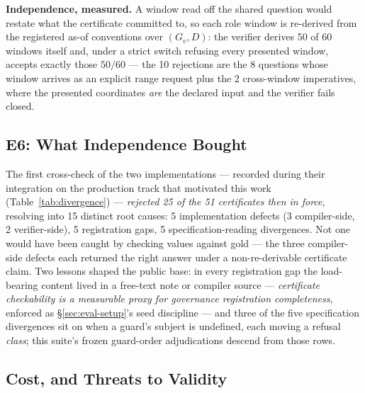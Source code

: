 \smallskip\noindent{}\textbf{Independence, measured.} A window
read off the shared question would restate what
the certificate committed to, so each role window is re-derived from
the registered as-of conventions over $(G_v,D)$: the verifier derives 50 of
60 windows itself and, under a strict switch refusing every presented
window, accepts exactly those $50/60$ --- the 10 rejections are the
8 questions whose window arrives as an explicit range request plus the
2 cross-window imperatives, where the presented coordinates \emph{are} the
declared input and the verifier fails closed.



\subsection{E6: What Independence Bought}
\label{sec:eval-divergence}

 The first cross-check of the two implementations --- recorded during their
integration on the production track that motivated this work
(Table~\ref{tab:divergence}) ---
\emph{rejected 25 of the 51 certificates then in force}, resolving into 15
distinct root causes: 5 implementation defects (3 compiler-side, 2
verifier-side), 5 registration gaps, 5 specification-reading divergences. Not
one would have been caught by checking values against gold --- the three
compiler-side defects each returned the right answer under a
non-re-derivable certificate claim. Two lessons shaped the public base: in
every registration gap the load-bearing content lived in a free-text note or
compiler source ---
\emph{certificate checkability is a measurable proxy for governance
registration completeness}, enforced as \S\ref{sec:eval-setup}'s seed
discipline --- and three of the five specification
divergences sit on when a guard's subject is undefined, each moving a
refusal \emph{class}; this suite's frozen guard-order adjudications
descend from those rows.

\subsection{Cost, and Threats to Validity}
\label{sec:eval-cost}
\label{sec:eval-threats}

